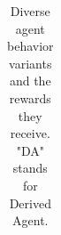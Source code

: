 \begin{table}
\begin{longtable}{l|ccccccc|l}
    
    \caption{Diverse agent behavior variants and the rewards they receive. "DA" stands for Derived Agent.}
    \label{appendix:baselines_observations}
    
    \end{longtable}%

       
\end{table}

 

